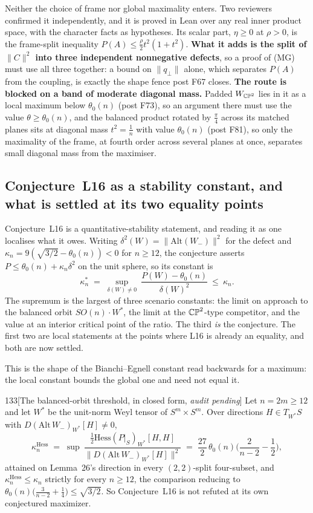 Neither the choice of frame nor global maximality enters. Two reviewers confirmed it independently, and it is proved in Lean over any real inner product space, with the character facts as hypotheses. Its scalar part, $\eta\ge0$ at $\rho>0$, is the frame-split inequality $P(A)\le\tfrac\rho2t^2(1+t^2)$. \textbf{What it adds is the split of $\lVert C\rVert^2$ into three independent nonnegative defects}, so a proof of (MG) must use all three together: a bound on $\lVert q_\perp\rVert$ alone, which separates $P(A)$ from the coupling, is exactly the shape fence post F67 closes. \textbf{The route is blocked on a band of moderate diagonal mass.} Padded $W_{\mathbb{CP}^2}$ lies in it as a local maximum below $\theta_0(n)$ (post F73), so an argument there must use the value $\theta\ge\theta_0(n)$, and the balanced product rotated by $\tfrac\pi4$ across its matched planes sits at diagonal mass $t^2=\tfrac1n$ with value $\theta_0(n)$ (post F81), so only the maximality of the frame, at fourth order across several planes at once, separates small diagonal mass from the maximiser.

\subsection{Conjecture~L16 as a stability constant, and what is settled at its two equality points}\label{sec:stability}

Conjecture~L16 is a quantitative-stability statement, and reading it as one localises what it owes. Writing $\delta^2(W)=\|\mathrm{Alt}(W_-)\|^2$ for the defect and $\kappa_n=9(\sqrt{3/2}-\theta_0(n))<0$ for $n\ge12$, the conjecture asserts $P\le\theta_0(n)+\kappa_n\delta^2$ on the unit sphere, so its constant is
\[
  \kappa^*_n\;=\;\sup_{\delta(W)\neq0}\ \frac{P(W)-\theta_0(n)}{\delta(W)^2}\ \le\ \kappa_n .
\]
The supremum is the largest of three scenario constants: the limit on approach to the balanced orbit $SO(n)\cdot W^*$, the limit at the $\mathbb{CP}^2$-type competitor, and the value at an interior critical point of the ratio. The third \emph{is} the conjecture. The first two are local statements at the points where L16 is already an equality, and both are now settled.

This is the shape of the Bianchi--Egnell constant read backwards for a maximum: the local constant bounds the global one and need not equal it.

\begin{Lem}{133}[The balanced-orbit threshold, in closed form, \emph{audit pending}]
Let $n=2m\ge12$ and let $W^*$ be the unit-norm Weyl tensor of $S^m\times S^m$. Over directions $H\in T_{W^*}S$ with $D(\mathrm{Alt}\,W_-)_{W^*}[H]\neq0$,
\[
  \kappa_n^{\mathrm{Hess}}\;=\;\sup\ \frac{\tfrac12\mathrm{Hess}(P|_S)_{W^*}[H,H]}{\|D(\mathrm{Alt}\,W_-)_{W^*}[H]\|^2}\;=\;\frac{27}{2}\,\theta_0(n)\Big(\frac{2}{n-2}-\frac12\Big),
\]
attained on Lemma~26's direction in every $(2,2)$-split four-subset, and $\kappa_n^{\mathrm{Hess}}\le\kappa_n$ strictly for every $n\ge12$, the comparison reducing to $\theta_0(n)\big(\tfrac3{n-2}+\tfrac14\big)\le\sqrt{3/2}$. So Conjecture~L16 is not refuted at its own conjectured maximizer.
\end{Lem}

